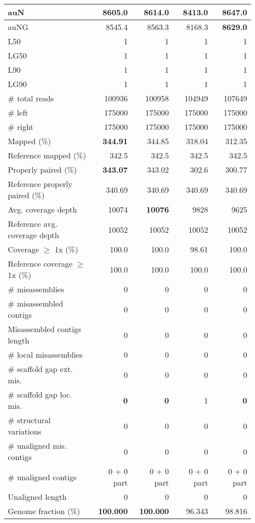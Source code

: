 \documentclass[12pt,a4paper]{article}
\begin{document}
\begin{table}[ht]
\begin{center}
\begin{tabular}{|l*{4}{|r}|}
auN & 8605.0 & 8614.0 & 8413.0 & {\bf 8647.0} \\ \hline
auNG & 8545.4 & 8563.3 & 8168.3 & {\bf 8629.0} \\ \hline
L50 & 1 & 1 & 1 & 1 \\ \hline
LG50 & 1 & 1 & 1 & 1 \\ \hline
L90 & 1 & 1 & 1 & 1 \\ \hline
LG90 & 1 & 1 & 1 & 1 \\ \hline
\# total reads & 100936 & 100958 & 104949 & 107649 \\ \hline
\# left & 175000 & 175000 & 175000 & 175000 \\ \hline
\# right & 175000 & 175000 & 175000 & 175000 \\ \hline
Mapped (\%) & {\bf 344.91} & 344.85 & 318.04 & 312.35 \\ \hline
Reference mapped (\%) & 342.5 & 342.5 & 342.5 & 342.5 \\ \hline
Properly paired (\%) & {\bf 343.07} & 343.02 & 302.6 & 300.77 \\ \hline
Reference properly paired (\%) & 340.69 & 340.69 & 340.69 & 340.69 \\ \hline
Avg. coverage depth & 10074 & {\bf 10076} & 9828 & 9625 \\ \hline
Reference avg. coverage depth & 10052 & 10052 & 10052 & 10052 \\ \hline
Coverage $\geq$ 1x (\%) & 100.0 & 100.0 & 98.61 & 100.0 \\ \hline
Reference coverage $\geq$ 1x (\%) & 100.0 & 100.0 & 100.0 & 100.0 \\ \hline
\# misassemblies & 0 & 0 & 0 & 0 \\ \hline
\# misassembled contigs & 0 & 0 & 0 & 0 \\ \hline
Misassembled contigs length & 0 & 0 & 0 & 0 \\ \hline
\# local misassemblies & 0 & 0 & 0 & 0 \\ \hline
\# scaffold gap ext. mis. & 0 & 0 & 0 & 0 \\ \hline
\# scaffold gap loc. mis. & {\bf 0} & {\bf 0} & 1 & {\bf 0} \\ \hline
\# structural variations & 0 & 0 & 0 & 0 \\ \hline
\# unaligned mis. contigs & 0 & 0 & 0 & 0 \\ \hline
\# unaligned contigs & 0 + 0 part & 0 + 0 part & 0 + 0 part & 0 + 0 part \\ \hline
Unaligned length & 0 & 0 & 0 & 0 \\ \hline
Genome fraction (\%) & {\bf 100.000} & {\bf 100.000} & 96.343 & 98.816 \\ \hline

\end{tabular}
\end{center}
\end{table}
\end{document}
